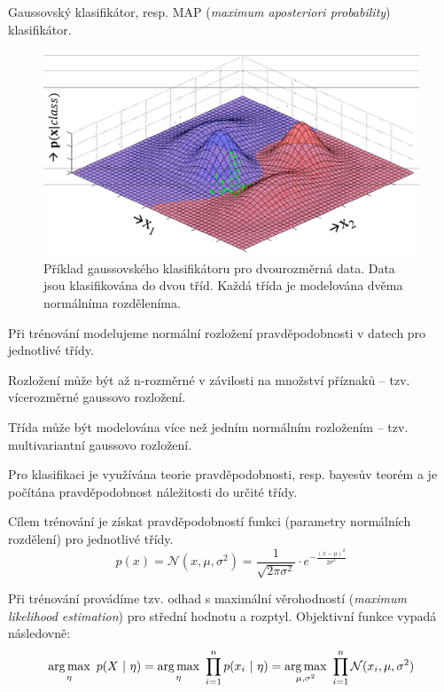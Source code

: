 \begin{compactitem}
    \item Gaussovský klasifikátor, resp. MAP (\textit{maximum aposteriori probability}) klasifikátor.

    \begin{figure}[H]
        \centering
        \includegraphics[width=0.9\linewidth]{gauss_classification.pdf}
        \caption{Příklad gaussovského klasifikátoru pro dvourozměrná data. Data jsou klasifikována do dvou tříd. Každá třída je modelována dvěma normálníma rozděleníma.}
    \end{figure}

    \item Při trénování modelujeme normální rozložení pravděpodobnosti v datech pro jednotlivé třídy. \begin{compactitem}
        \item Rozložení může být až n-rozměrné v závilosti na množství příznaků -- tzv. vícerozměrné gaussovo rozložení.
        \item Třída může být modelována více než jedním normálním rozložením -- tzv. multivariantní gaussovo rozložení.
    \end{compactitem}

    \item Pro klasifikaci je využívána teorie pravděpodobnosti, resp. bayesův teorém a je počítána pravděpodobnost náležitosti do určité třídy.

    \item Cílem trénování je získat pravděpodobností funkci (parametry normálních rozdělení) pro jednotlivé třídy.
    $${\displaystyle p(x) = \mathcal{N}(x, \mu, \sigma^2) = \frac{1}{\sqrt{2 \pi \sigma^2}} \cdot e^{- \frac{(x - \mu)^2}{2 \sigma^2}} }$$

    \item Při trénování provádíme tzv. odhad s maximální věrohodností (\textit{maximum likelihood estimation}) pro střední hodnotu a rozptyl. Objektivní funkce vypadá následovně:
    $$ {\displaystyle \operatorname*{arg\,max}_{\eta} ~ p(X ~|~ \eta) = \operatorname*{arg\,max}_{\eta} ~ \prod_{i=1}^{n} p(x_i ~|~ \mathbf{\eta}) = \operatorname*{arg\,max}_{\mu, \sigma^2} ~ \prod_{i=1}^{n} \mathcal{N}(x_i, \mu, \sigma^2)} $$


\end{compactitem}
